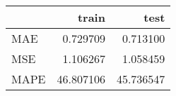 \begin{tabular}{lrr}
\toprule
{} &      train &       test \\
\midrule
MAE  &   0.729709 &   0.713100 \\
MSE  &   1.106267 &   1.058459 \\
MAPE &  46.807106 &  45.736547 \\
\bottomrule
\end{tabular}
